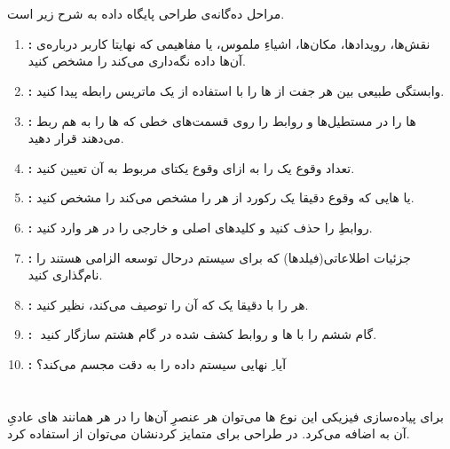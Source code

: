 \documentclass{article}
\begin{document}


\newpage


\section{}
مراحل ده‌گانه‌ی طراحی پایگاه داده به شرح زیر است.
\begin{enumerate}
    \item \textbf{:}
نقش‌ها، رویدادها، مکان‌ها، اشیاءِ ملموس، یا مفاهیمی که نهایتا کاربر درباره‌ی آن‌ها داده نگه‌داری می‌کند را مشخص کنید.
    \item \textbf{:}
وابستگی طبیعی بین هر جفت از ها را با استفاده از یک ماتریس رابطه پیدا کنید.
	\item \textbf{:}
ها را در مستطیل‌ها و روابط را روی قسمت‌های خطی که ها را به هم ربط می‌دهند قرار دهید.
	\item \textbf{:}
تعداد وقوع یک  را به ازای وقوع یکتای  مربوط به آن تعیین کنید.
	\item \textbf{:}
 یا هایی که وقوع دقیقا یک رکورد از هر  را مشخص می‌کند را مشخص کنید.
	\item \textbf{:}
روابطِ  را حذف کنید و کلید‌های اصلی و خارجی را در هر  وارد کنید.
	\item \textbf{:}
جزئیات اطلاعاتی(فیلدها) که برای سیستم درحال توسعه الزامی هستند را نام‌گذاری کنید.
	\item \textbf{:}
هر  را با دقیقا یک  که آن را توصیف می‌کند، نظیر کنید.
	\item \textbf{:}
ِ گام ششم را با ها و روابط کشف شده در گام هشتم سازگار کنید.
	\item \textbf{:}
آیا ِ نهایی سیستم داده را به دقت مجسم می‌کند؟
\end{enumerate}

\section{}
\subsection{}
برای پیاده‌سازی فیزیکی این نوع ها می‌توان هر عنصرِ آن‌ها را در هر  همانند های عادیِ آن  به  اضافه می‌کرد. در طراحی برای متمایز کردنشان می‌توان از  استفاده کرد.
\end{document}
